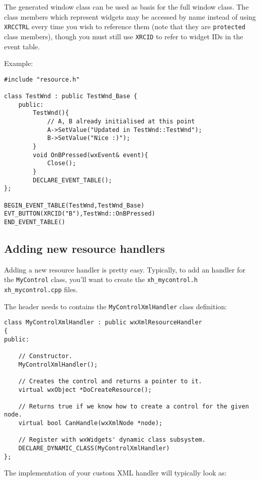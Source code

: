 The generated window class can be used as basis for the full window class. The
class members which represent widgets may be accessed by name instead of using
{\tt XRCCTRL} every time you wish to reference them (note that they are {\tt protected} class members), 
though you must still use {\tt XRCID} to refer to widget IDs in the event
table. 

Example:

\begin{verbatim}
#include "resource.h"

class TestWnd : public TestWnd_Base {
	public:
		TestWnd(){
			// A, B already initialised at this point
			A->SetValue("Updated in TestWnd::TestWnd");
			B->SetValue("Nice :)");
		}
		void OnBPressed(wxEvent& event){
			Close();
		}
		DECLARE_EVENT_TABLE();
};

BEGIN_EVENT_TABLE(TestWnd,TestWnd_Base)
EVT_BUTTON(XRCID("B"),TestWnd::OnBPressed)
END_EVENT_TABLE()

\end{verbatim}



\subsection{Adding new resource handlers}\label{newresourcehandlers}

Adding a new resource handler is pretty easy.
Typically, to add an handler for the {\tt MyControl} class, you'll want to create
the {\tt xh\_mycontrol.h} {\tt xh\_mycontrol.cpp} files.

The header needs to contains the {\tt MyControlXmlHandler} class definition:

\begin{verbatim}
class MyControlXmlHandler : public wxXmlResourceHandler
{
public:

    // Constructor.
    MyControlXmlHandler();

    // Creates the control and returns a pointer to it.
    virtual wxObject *DoCreateResource();

    // Returns true if we know how to create a control for the given node.
    virtual bool CanHandle(wxXmlNode *node);

    // Register with wxWidgets' dynamic class subsystem.
    DECLARE_DYNAMIC_CLASS(MyControlXmlHandler)
};
\end{verbatim}

The implementation of your custom XML handler will typically look as:

